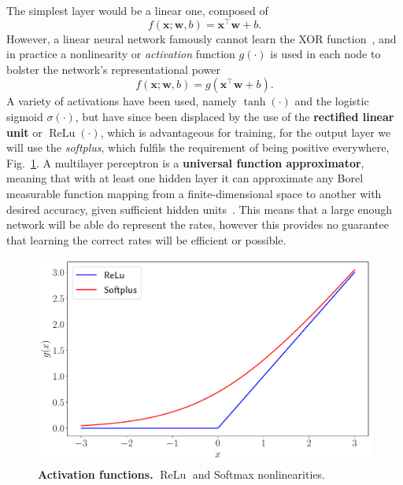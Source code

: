 \noindent
The simplest layer would be a linear one, composed of
\begin{equation}
f(\mathbf{x}; \mathbf{w}, b) = \mathbf{x}^\intercal \mathbf{w} + b.
\end{equation}
However, a linear neural network famously cannot learn the XOR function~\cite{minsky2017perceptrons}, and in practice a nonlinearity or \emph{activation} function $g(\cdot)$ is used in each node to bolster the network's representational power
\begin{equation}
f(\mathbf{x}; \mathbf{w}, b) = g\left(\mathbf{x}^\intercal \mathbf{w} + b\right).
\end{equation}
A variety of activations have been used, namely $\tanh(\cdot)$ and the logistic sigmoid $\sigma(\cdot)$, but have since been displaced by the use of the \textbf{rectified linear unit} or $\operatorname{ReLu}(\cdot)$, which is advantageous for training, for the output layer we will use the \emph{softplus}, which fulfils the requirement of being positive everywhere, Fig.~\ref{fig:activations}. A multilayer perceptron is a \textbf{universal function approximator}, meaning that with at least one hidden layer it can approximate any Borel measurable function mapping from a finite-dimensional space to another with desired accuracy, given sufficient hidden units~\cite{leshno1993multilayer}. This means that a large enough network will be able do represent the rates, however this provides no guarantee that learning the correct rates will be efficient or possible. 
\begin{figure}[H]
	\centering
	\includegraphics[width=0.7\linewidth]{Chapter4/Figs/Vector/activations}
	\caption[Activation functions]{\textbf{Activation functions.} $\operatorname{ReLu}$ and Softmax nonlinearities.}
	\label{fig:activations}
\end{figure}

